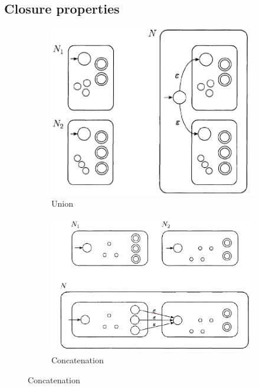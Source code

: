 \documentclass[12pt,a4paper]{article}
\newcommand{\<}{\langle}
\renewcommand{\>}{\rangle}
\begin{document}
\subsection{Closure properties}
\begin{figure}
    \centering
    \begin{subfigure}{0.45\textwidth}
        \includegraphics[scale=0.3]{images/union}
        \caption{Union}
        \label{subfig: union DFA}
    \end{subfigure}
    \begin{subfigure}{0.45\textwidth}
        \includegraphics[scale=0.3]{images/concatenation}
        \caption{Concatenation}
        \label{subfig: concat DFA}
    \end{subfigure}

\end{figure}
\end{document}

